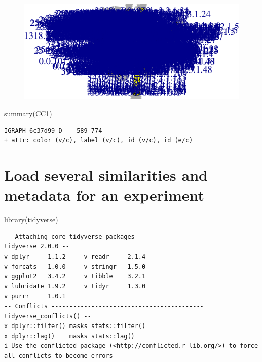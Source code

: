 \documentclass[
  letterpaper,
  DIV=11,
  numbers=noendperiod]{scrreprt}
\newenvironment{Shaded}{\begin{snugshade}}{\end{snugshade}}
\newcommand{\FunctionTok}[1]{\textcolor[rgb]{0.28,0.35,0.67}{#1}}
\newcommand{\NormalTok}[1]{\textcolor[rgb]{0.00,0.23,0.31}{#1}}
\begin{document}
\begin{figure}[H]

{\centering \includegraphics{./data_load_files/figure-pdf/unnamed-chunk-13-1.pdf}

}

\end{figure}

\begin{Shaded}
\begin{Highlighting}[]
\FunctionTok{summary}\NormalTok{(CC1)}
\end{Highlighting}
\end{Shaded}

\begin{verbatim}
IGRAPH 6c37d99 D--- 589 774 -- 
+ attr: color (v/c), label (v/c), id (v/c), id (e/c)
\end{verbatim}


\hypertarget{load-several-similarities-and-metadata-for-an-experiment}{%
\chapter{Load several similarities and metadata for an
experiment}\label{load-several-similarities-and-metadata-for-an-experiment}}

\begin{Shaded}
\begin{Highlighting}[]
\FunctionTok{library}\NormalTok{(tidyverse)}
\end{Highlighting}
\end{Shaded}

\begin{verbatim}
-- Attaching core tidyverse packages ------------------------ tidyverse 2.0.0 --
v dplyr     1.1.2     v readr     2.1.4
v forcats   1.0.0     v stringr   1.5.0
v ggplot2   3.4.2     v tibble    3.2.1
v lubridate 1.9.2     v tidyr     1.3.0
v purrr     1.0.1     
-- Conflicts ------------------------------------------ tidyverse_conflicts() --
x dplyr::filter() masks stats::filter()
x dplyr::lag()    masks stats::lag()
i Use the conflicted package (<http://conflicted.r-lib.org/>) to force all conflicts to become errors
\end{verbatim}
\end{document}
